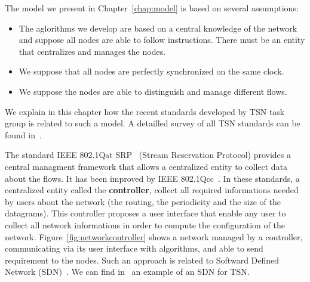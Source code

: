 The model we present in Chapter~\ref{chap:model} is based on several assumptions:
\begin{itemize}
\item The aglorithms we develop are based on a central knowledge of the network and suppose all nodes are able to follow instructions. There must be an entity that centralizes and manages the nodes.
\item We suppose that all nodes are perfectly synchronized on the same clock.
\item We suppose the nodes are able to distinguish and manage different flows.
\end{itemize}

We explain in this chapter how the recent standards developed by TSN task group is related to such a model. A detailled survey of all TSN standards can be found in~\cite{8458130}. 


The standard IEEE 802.1Qat SRP~\cite{article} (Stream Reservation Protocol) provides a central managment framework that allows a centralized entity to collect data about the flows. It has been improved by IEEE 802.1Qcc~\cite{6755436}. In these standards, a centralized entity called the \textbf{controller}, collect all required informations needed by users about the network (the routing, the periodicity and the size of the datagrams). This controller proposes a user interface that enable any user to collect all network informations in order to compute the configuration of the network. Figure~\ref{fig:networkcontroller} shows a network managed by a controller, communicating via its user interface with algorithms, and able to send requirement to the nodes. Such an approach is related to Softward Defined Network (SDN)~\cite{li2015software}. We can find in~\cite{7356556} an example of an SDN for TSN.


